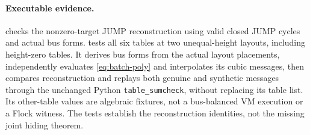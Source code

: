 \documentclass[11pt]{article}
\begin{document}
\paragraph{Executable evidence.}  checks the nonzero-target JUMP reconstruction using valid closed JUMP cycles and actual bus forms.  tests all six tables at two unequal-height layouts, including height-zero tables. It derives bus forms from the actual layout placements, independently evaluates \eqref{eq:batch-poly} and interpolates its cubic messages, then compares reconstruction and replays both genuine and synthetic messages through the unchanged Python \texttt{table\_sumcheck}, without replacing its table list. Its other-table values are algebraic fixtures, not a bus-balanced VM execution or a Flock witness. The tests establish the reconstruction identities, not the missing joint hiding theorem.
\end{document}
